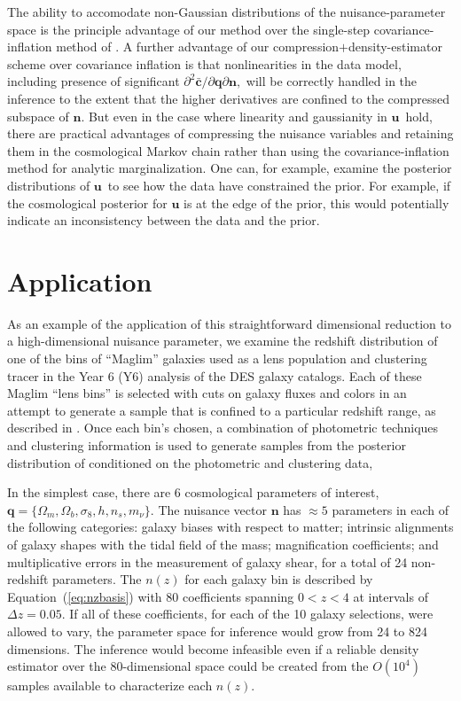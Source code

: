 \documentclass[linenumbers, onecolumn, resetfootnote]{aastex7}
\newcommand{\ed}[1]{{\color{red}{#1}}}
\newcommand{\ie}{\textit{i.e.}}
\newcommand{\eqq}[1]{Equation~(\ref{#1})}
\newcommand{\vecq}{\ensuremath{\mathbf{q}}}
\newcommand{\vecn}{\ensuremath{\mathbf{n}}}
\newcommand{\vecu}{\ensuremath{\mathbf{u}}}
\newcommand{\hatc}{\ensuremath{\bar{\mathbf{c}}}}
\begin{document}
The ability to accomodate non-Gaussian distributions of the
nuisance-parameter space is the principle
advantage of our method over the single-step covariance-inflation
method of \citet{hans}.  A further advantage of our
compression$+$density-estimator scheme over covariance inflation is
that nonlinearities in the data model, including presence of
significant $\partial^2\hatc/\partial\vecq\partial\vecn,$ will be
correctly handled in the inference to the extent that the higher
derivatives are confined to the compressed subspace of $\vecn.$ 
But even in the case where linearity and gaussianity in \vecu\ hold,
there are practical advantages of compressing the nuisance 
variables and retaining them in the cosmological Markov chain rather
than using the covariance-inflation method for analytic
marginalization.  One can, for example, examine the posterior
distributions of \vecu\ to see how the data have constrained the prior.  For example, if the cosmological posterior for $\vecu$ is at the edge of the prior, this would potentially indicate an inconsistency between the data and
the prior.
  

\section{Application}\label{sec:app}
As an example of the application of this straightforward dimensional
reduction to a high-dimensional nuisance parameter, we examine the
redshift distribution of one of the bins of ``Maglim''  galaxies used
as a lens population and clustering tracer in the Year 6 (Y6) analysis of
the DES galaxy catalogs.  Each of these Maglim ``lens bins''
is selected with cuts on galaxy fluxes and
colors in an attempt to generate a sample that is confined to a
particular redshift range, as described in \citet{y6maglim}.  Once each bin's
\ed{galaxy selection criteria are} chosen, a combination of 
photometric techniques \citep{y6lenspz,y6pz} and clustering information
\citep{y6wz} is used to generate samples from the posterior
distribution of  \ed{$n(z)$ functions applicable to the bin members,} conditioned
on the photometric and clustering data, \ed{\ie\ the $p(\vecn)$ that will become the
  prior for the inference of \vecq.}

In the simplest case,
there are 6 cosmological parameters of interest, $\vecq = \{\Omega_m,
\Omega_b, \sigma_8, h, n_s, m_\nu\}.$   The nuisance vector $\vecn$
has $\approx 5$  parameters in each of the following categories: galaxy
biases with respect to matter; intrinsic alignments of galaxy shapes
with the tidal field of the mass; magnification coefficients; and multiplicative errors in the
measurement of galaxy shear, for a total of 24 non-redshift parameters.  The $n(z)$ for each galaxy bin
is
described by \eqq{eq:nzbasis} with 80 coefficients spanning $0<z<4$ at
intervals of $\Delta z=0.05.$ If all of these coefficients, for each
of the 10 galaxy selections, were allowed to vary, the parameter space for inference would grow from 24 to 824 dimensions.
The inference would become infeasible even if a
reliable density estimator over the 80-dimensional space could be
created from the $O(10^4)$ samples available to characterize each
$n(z).$ 
\end{document}
